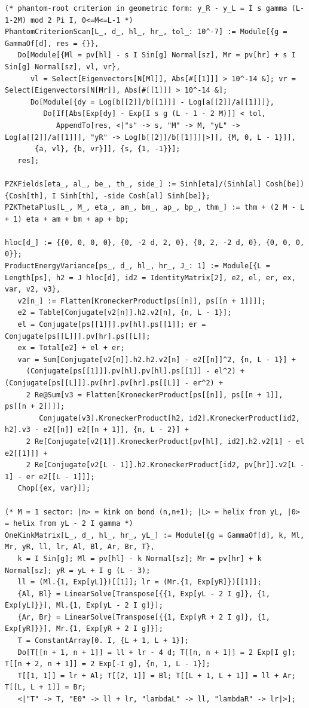 \documentclass[11pt,a4paper]{article}
\theoremstyle{definition}
\begin{document}
\begin{lstlisting}
(* phantom-root criterion in geometric form: y_R - y_L = I s gamma (L-1-2M) mod 2 Pi I, 0<=M<=L-1 *)
PhantomCriterionScan[L_, d_, hl_, hr_, tol_: 10^-7] := Module[{g = GammaOf[d], res = {}},
   Do[Module[{Ml = pv[hl] - s I Sin[g] Normal[sz], Mr = pv[hr] + s I Sin[g] Normal[sz], vl, vr},
      vl = Select[Eigenvectors[N[Ml]], Abs[#[[1]]] > 10^-14 &]; vr = Select[Eigenvectors[N[Mr]], Abs[#[[1]]] > 10^-14 &];
      Do[Module[{dy = Log[b[[2]]/b[[1]]] - Log[a[[2]]/a[[1]]]},
         Do[If[Abs[Exp[dy] - Exp[I s g (L - 1 - 2 M)]] < tol,
            AppendTo[res, <|"s" -> s, "M" -> M, "yL" -> Log[a[[2]]/a[[1]]], "yR" -> Log[b[[2]]/b[[1]]]|>]], {M, 0, L - 1}]],
       {a, vl}, {b, vr}]], {s, {1, -1}}];
   res];

PZKFields[eta_, al_, be_, th_, side_] := Sinh[eta]/(Sinh[al] Cosh[be]) {Cosh[th], I Sinh[th], -side Cosh[al] Sinh[be]};
PZKThetaPlus[L_, M_, eta_, am_, bm_, ap_, bp_, thm_] := thm + (2 M - L + 1) eta + am + bm + ap + bp;

hloc[d_] := {{0, 0, 0, 0}, {0, -2 d, 2, 0}, {0, 2, -2 d, 0}, {0, 0, 0, 0}};
ProductEnergyVariance[ps_, d_, hl_, hr_, J_: 1] := Module[{L = Length[ps], h2 = J hloc[d], id2 = IdentityMatrix[2], e2, el, er, ex, var, v2, v3},
   v2[n_] := Flatten[KroneckerProduct[ps[[n]], ps[[n + 1]]]];
   e2 = Table[Conjugate[v2[n]].h2.v2[n], {n, L - 1}];
   el = Conjugate[ps[[1]]].pv[hl].ps[[1]]; er = Conjugate[ps[[L]]].pv[hr].ps[[L]];
   ex = Total[e2] + el + er;
   var = Sum[Conjugate[v2[n]].h2.h2.v2[n] - e2[[n]]^2, {n, L - 1}] +
     (Conjugate[ps[[1]]].pv[hl].pv[hl].ps[[1]] - el^2) + (Conjugate[ps[[L]]].pv[hr].pv[hr].ps[[L]] - er^2) +
     2 Re@Sum[v3 = Flatten[KroneckerProduct[ps[[n]], ps[[n + 1]], ps[[n + 2]]]];
        Conjugate[v3].KroneckerProduct[h2, id2].KroneckerProduct[id2, h2].v3 - e2[[n]] e2[[n + 1]], {n, L - 2}] +
     2 Re[Conjugate[v2[1]].KroneckerProduct[pv[hl], id2].h2.v2[1] - el e2[[1]]] +
     2 Re[Conjugate[v2[L - 1]].h2.KroneckerProduct[id2, pv[hr]].v2[L - 1] - er e2[[L - 1]]];
   Chop[{ex, var}]];

(* M = 1 sector: |n> = kink on bond (n,n+1); |L> = helix from yL, |0> = helix from yL - 2 I gamma *)
OneKinkMatrix[L_, d_, hl_, hr_, yL_] := Module[{g = GammaOf[d], k, Ml, Mr, yR, ll, lr, Al, Bl, Ar, Br, T},
   k = I Sin[g]; Ml = pv[hl] - k Normal[sz]; Mr = pv[hr] + k Normal[sz]; yR = yL + I g (L - 3);
   ll = (Ml.{1, Exp[yL]})[[1]]; lr = (Mr.{1, Exp[yR]})[[1]];
   {Al, Bl} = LinearSolve[Transpose[{{1, Exp[yL - 2 I g]}, {1, Exp[yL]}}], Ml.{1, Exp[yL - 2 I g]}];
   {Ar, Br} = LinearSolve[Transpose[{{1, Exp[yR + 2 I g]}, {1, Exp[yR]}}], Mr.{1, Exp[yR + 2 I g]}];
   T = ConstantArray[0. I, {L + 1, L + 1}];
   Do[T[[n + 1, n + 1]] = ll + lr - 4 d; T[[n, n + 1]] = 2 Exp[I g]; T[[n + 2, n + 1]] = 2 Exp[-I g], {n, 1, L - 1}];
   T[[1, 1]] = lr + Al; T[[2, 1]] = Bl; T[[L + 1, L + 1]] = ll + Ar; T[[L, L + 1]] = Br;
   <|"T" -> T, "E0" -> ll + lr, "lambdaL" -> ll, "lambdaR" -> lr|>];


\end{lstlisting}
\end{document}
